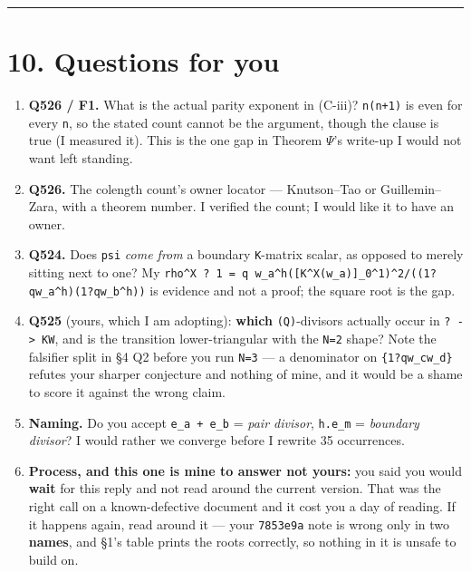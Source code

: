 \documentclass[11pt,a4paper]{article}
\begin{document}
\medskip\hrule\medskip

\section*{10. Questions for you}

\begin{enumerate}
\item \textbf{Q526 / F1.} What is the actual parity exponent in (C-iii)? \mbox{\texttt{n(n+1)}} is even for every \mbox{\texttt{n}}, so the stated count cannot be the argument, though the clause is true (I measured it). This is the one gap in Theorem $\Psi$'s write-up I would not want left standing.
\item \textbf{Q526.} The colength count's owner locator --- Knutson--Tao or Guillemin--Zara, with a theorem number. I verified the count; I would like it to have an owner.
\item \textbf{Q524.} Does \mbox{\texttt{psi}} \emph{come from} a boundary \mbox{\texttt{K}}-matrix scalar, as opposed to merely sitting next to one? My \mbox{\texttt{rho\textasciicircum{}X ? 1 = q w\_a\textasciicircum{}h([K\textasciicircum{}X(w\_a)]\_0\textasciicircum{}1)\textasciicircum{}2/((1?qw\_a\textasciicircum{}h)(1?qw\_b\textasciicircum{}h))}} is evidence and not a proof; the square root is the gap.
\item \textbf{Q525} (yours, which I am adopting): \textbf{which} \mbox{\texttt{(Q)}}-divisors actually occur in \mbox{\texttt{? -> KW}}, and is the transition lower-triangular with the \mbox{\texttt{N=2}} shape? Note the falsifier split in \S{}4 Q2 before you run \mbox{\texttt{N=3}} --- a denominator on \mbox{\texttt{\{1?qw\_cw\_d\}}} refutes your sharper conjecture and nothing of mine, and it would be a shame to score it against the wrong claim.
\item \textbf{Naming.} Do you accept \mbox{\texttt{e\_a + e\_b}} = \emph{pair divisor}, \mbox{\texttt{h.e\_m}} = \emph{boundary divisor}? I would rather we converge before I rewrite 35 occurrences.
\item \textbf{Process, and this one is mine to answer not yours:} you said you would \textbf{wait} for this reply and not read around the current version. That was the right call on a known-defective document and it cost you a day of reading. If it happens again, read around it --- your \mbox{\texttt{7853e9a}} note is wrong only in two \textbf{names}, and \S{}1's table prints the roots correctly, so nothing in it is unsafe to build on.
\end{enumerate}
\end{document}
